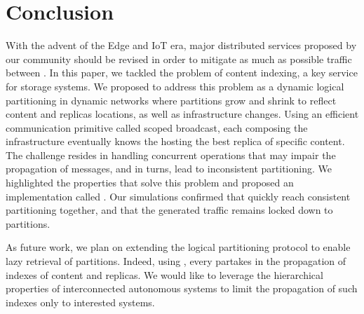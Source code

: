 \section{Conclusion}
\label{sec:conclusion}

With the advent of the Edge and IoT era, major distributed services
proposed by our community should be revised in order to mitigate as
much as possible traffic between \processes.  In this paper, we
tackled the problem of content indexing, a key service for storage
systems.
%
We proposed to address this problem as a dynamic logical partitioning
in dynamic networks where partitions grow and shrink to reflect
content and replicas locations, as well as infrastructure
changes. Using an efficient communication primitive called scoped
broadcast, each \process composing the infrastructure eventually knows
the \process hosting the best replica of specific content.  The
challenge resides in handling concurrent operations that may impair
the propagation of messages, and in turns, lead to inconsistent
partitioning. 
%
We highlighted the properties that solve this problem and proposed an
implementation called \NAME.  Our simulations confirmed that
\processes quickly reach consistent partitioning together, and that
the generated traffic remains locked down to partitions.

As future work, we plan on extending the logical partitioning protocol
to enable lazy retrieval of partitions. Indeed, using \NAME, every
\process partakes in the propagation of indexes of content and
replicas. We would like to leverage the hierarchical properties of
interconnected autonomous systems to limit the propagation of such
indexes only to interested systems.
%
%
%

